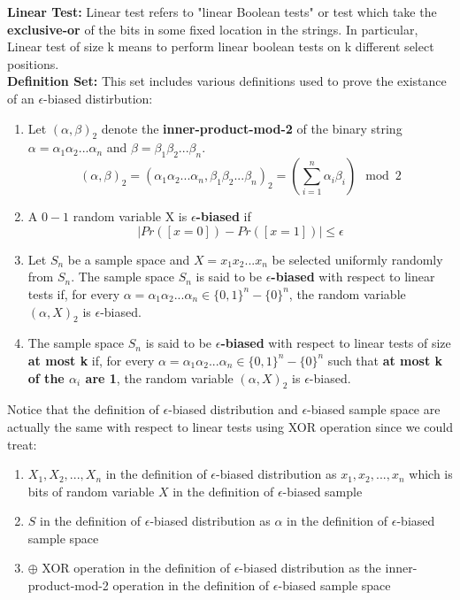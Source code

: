 \documentclass[letterpaper]{article} %
\begin{document}
	\noindent\textbf{Linear Test:} Linear test refers to "linear Boolean tests" or test which take the \textbf{exclusive-or} of the bits in some fixed location in the strings. In particular, Linear test of size k means to perform linear boolean tests on k different select positions.\\

	\noindent\textbf{Definition Set:} This set includes various definitions used to prove the existance of an $\epsilon$-biased distirbution:
	\begin{enumerate}
	\item Let $(\alpha,\beta)_2$ denote the \textbf{inner-product-mod-2} of the binary string $\alpha=\alpha_1\alpha_2...\alpha_n$ and $\beta=\beta_1\beta_2...\beta_n$.
	$$(\alpha,\beta)_2 =(\alpha_1\alpha_2...\alpha_n,\beta_1\beta_2...\beta_n)_2= (\sum_{i=1}^n \alpha_i\beta_i) \mod 2$$
	\item A $0-1$ random variable X is \textbf{$\epsilon$-biased} if
		$$|Pr([x=0])-Pr([x=1])|\le \epsilon$$
	\item Let $S_n$ be a sample space and $X=x_1x_2...x_n$ be selected uniformly randomly from $S_n$. The sample space $S_n$ is said to be \textbf{$\epsilon$-biased} with respect to linear tests if, for every $\alpha=\alpha_1\alpha_2...\alpha_n\in\{0,1\}^n-\{0\}^n$, the random variable $(\alpha,X)_2$ is $\epsilon$-biased.
	\item The sample space $S_n$ is said to be \textbf{$\epsilon$-biased} with respect to linear tests of size \textbf{at most k} if, for every $\alpha=\alpha_1\alpha_2...\alpha_n\in\{0,1\}^n-\{0\}^n$ such that \textbf{at most k of the $\alpha_i$ are 1}, the random variable $(\alpha,X)_2$ is $\epsilon$-biased.
	\end{enumerate}
	Notice that the definition of $\epsilon$-biased distribution and $\epsilon$-biased sample space are actually the same with respect to linear tests using XOR operation since we could treat:
	\begin{enumerate}
		\item $X_1,X_2,...,X_n$ in the definition of $\epsilon$-biased distribution as $x_1,x_2,...,x_n$ which is bits of random variable $X$ in the definition of $\epsilon$-biased sample
		\item $S$  in the definition of $\epsilon$-biased distribution as $\alpha$ in the definition of $\epsilon$-biased sample space
		\item $\oplus$ XOR operation in the definition of $\epsilon$-biased distribution as the inner-product-mod-2 operation in the definition of $\epsilon$-biased sample space
	\end{enumerate}
	
\end{document}
